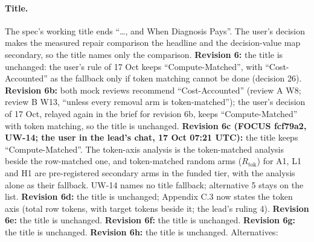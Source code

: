 \documentclass{article}
\theoremstyle{plain}
\theoremstyle{definition}
\theoremstyle{remark}
\begin{document}
\paragraph{Title.}
The spec's working title ends ``\ldots{}, and When Diagnosis Pays''. The user's
decision makes the measured repair comparison the headline and the
decision-value map secondary, so the title names only the comparison.
\textbf{Revision 6:} the title is unchanged: the user's rule of 17 Oct keeps
``Compute-Matched'', with ``Cost-Accounted'' as the fallback only if token
matching cannot be done (decision 26). \textbf{Revision 6b:} both mock reviews
recommend ``Cost-Accounted'' (review A W8; review B W13, ``unless every removal
arm is token-matched''); the user's decision of 17 Oct, relayed again in the
brief for revision 6b, keeps ``Compute-Matched'' with token matching, so the
title is unchanged. \textbf{Revision 6c (FOCUS fcf79a2, UW-14; the user in the
lead's chat, 17 Oct 07:21 UTC):} the title keeps ``Compute-Matched''. The
token-axis analysis is the token-matched analysis beside the row-matched one,
and token-matched random arms ($R_{\mathrm{tok}}$) for A1, L1 and H1 are
pre-registered secondary arms in the funded tier, with the analysis alone as
their fallback. UW-14 names no title fallback; alternative 5 stays on the list.
\textbf{Revision 6d:} the title is unchanged; Appendix C.3 now states the token
axis (total row tokens, with target tokens beside it; the lead's ruling 4).
\textbf{Revision 6e:} the title is unchanged. \textbf{Revision 6f:} the title is
unchanged. \textbf{Revision 6g:} the title is unchanged. \textbf{Revision 6h:}
the title is unchanged. Alternatives:
\end{document}
